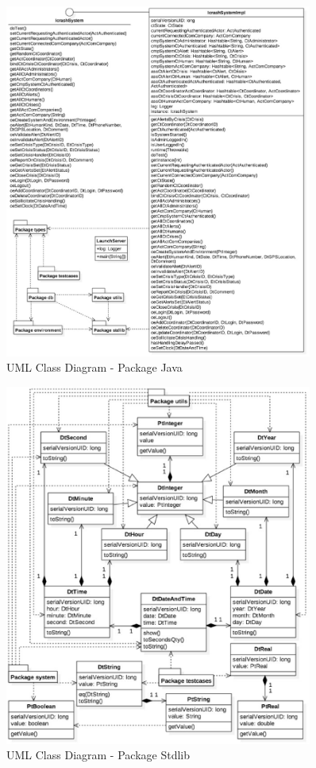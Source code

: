 \begin{figure}[h!]
	\centering
	\includegraphics[width=0.9\textwidth]{./images/dcm_java.eps}
	\caption{UML Class Diagram - Package Java}
\end{figure}


\begin{figure}[h!]
	\centering
	\includegraphics[width=0.9\textwidth]{./images/dcm_stdlib.eps}
	\caption{UML Class Diagram - Package Stdlib}
\end{figure}

